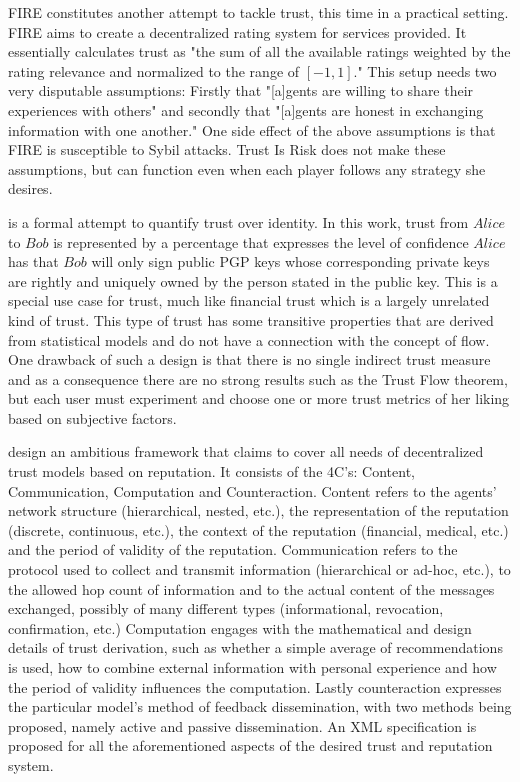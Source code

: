   FIRE \cite{fire} constitutes another attempt to tackle trust, this time in a practical setting. FIRE aims to create a
  decentralized rating system for services provided. It essentially calculates trust as "the sum of all the available ratings
  weighted by the rating relevance and normalized to the range of $\left[-1, 1\right]$." This setup needs two very disputable
  assumptions: Firstly that "[a]gents are willing to share their experiences with others" and secondly that "[a]gents are
  honest in exchanging information with one another." One side effect of the above assumptions is that FIRE is susceptible to
  Sybil attacks. Trust Is Risk does not make these assumptions, but can function even when each player follows any strategy
  she desires.

  \cite{wot} is a formal attempt to quantify trust over identity. In this work, trust from $Alice$ to $Bob$ is represented by
  a percentage that expresses the level of confidence $Alice$ has that $Bob$ will only sign public PGP keys whose
  corresponding private keys are rightly and uniquely owned by the person stated in the public key. This is a special use
  case for trust, much like financial trust which is a largely unrelated kind of trust. This type of trust has some
  transitive properties that are derived from statistical models and do not have a connection with the concept of flow. One
  drawback of such a design is that there is no single indirect trust measure and as a consequence there are no strong
  results such as the Trust Flow theorem, but each user must experiment and choose one or more trust metrics of her liking
  based on subjective factors.

  \cite{sdt} design an ambitious framework that claims to cover all needs of decentralized trust models based on reputation.
  It consists of the 4C's: Content, Communication, Computation and Counteraction. Content refers to the agents' network
  structure (hierarchical, nested, etc.), the representation of the reputation (discrete, continuous, etc.), the context of
  the reputation (financial, medical, etc.) and the period of validity of the reputation. Communication refers to the
  protocol used to collect and transmit information (hierarchical or ad-hoc, etc.), to the allowed hop count of information
  and to the actual content of the messages exchanged, possibly of many different types (informational, revocation,
  confirmation, etc.) Computation engages with the mathematical and design details of trust derivation, such as whether a
  simple average of recommendations is used, how to combine external information with personal experience and how the period
  of validity influences the computation. Lastly counteraction expresses the particular model's method of feedback
  dissemination, with two methods being proposed, namely active and passive dissemination. An XML specification is proposed
  for all the aforementioned aspects of the desired trust and reputation system.

